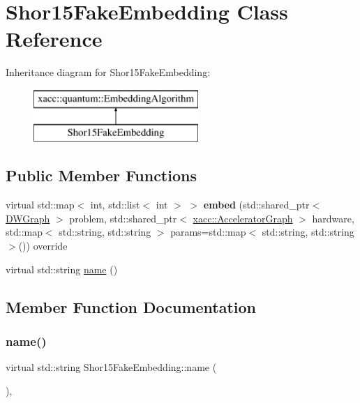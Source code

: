 \hypertarget{a01153}{}\section{Shor15\+Fake\+Embedding Class Reference}
\label{a01153}
Inheritance diagram for Shor15\+Fake\+Embedding\+:\begin{figure}[H]
\begin{center}
\leavevmode
\includegraphics[height=2.000000cm]{a01153}
\end{center}
\end{figure}
\subsection*{Public Member Functions}
\begin{DoxyCompactItemize}
\item 
\mbox{\label{a01153_a150d50287258be12f582e9bfa96eb3dd}} 
virtual std\+::map$<$ int, std\+::list$<$ int $>$ $>$ {\bfseries embed} (std\+::shared\+\_\+ptr$<$ \hyperlink{a01201}{D\+W\+Graph} $>$ problem, std\+::shared\+\_\+ptr$<$ \hyperlink{a01713}{xacc\+::\+Accelerator\+Graph} $>$ hardware, std\+::map$<$ std\+::string, std\+::string $>$ params=std\+::map$<$ std\+::string, std\+::string $>$()) override
\item 
virtual std\+::string \hyperlink{a01153_a367d7fb040def889895303a600021675}{name} ()
\end{DoxyCompactItemize}


\subsection{Member Function Documentation}
\mbox{\label{a01153_a367d7fb040def889895303a600021675}} 
\subsubsection{\texorpdfstring{name()}{name()}}
{\footnotesize\ttfamily virtual std\+::string Shor15\+Fake\+Embedding\+::name (\begin{DoxyParamCaption}{ }\end{DoxyParamCaption})\hspace{0.3cm}{\ttfamily [inline]}, {\ttfamily [virtual]}}

